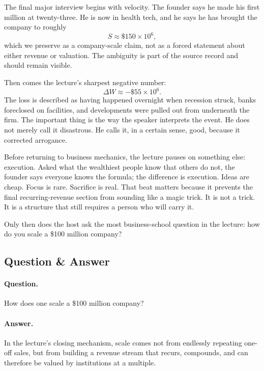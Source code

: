 The final major interview begins with velocity. The founder says he made his first million at twenty-three. He is now in health tech, and he says he has brought the company to roughly
\begin{equation}
S \approx \$150 \times 10^6,
\end{equation}
which we preserve as a company-scale claim, not as a forced statement about either revenue or valuation. The ambiguity is part of the source record and should remain visible.

Then comes the lecture's sharpest negative number:
\begin{equation}
\Delta W \approx -\$55 \times 10^6.
\end{equation}
The loss is described as having happened overnight when recession struck, banks foreclosed on facilities, and developments were pulled out from underneath the firm. The important thing is the way the speaker interprets the event. He does not merely call it disastrous. He calls it, in a certain sense, good, because it corrected arrogance.

Before returning to business mechanics, the lecture pauses on something else: execution. Asked what the wealthiest people know that others do not, the founder says everyone knows the formula; the difference is execution. Ideas are cheap. Focus is rare. Sacrifice is real. That beat matters because it prevents the final recurring-revenue section from sounding like a magic trick. It is not a trick. It is a structure that still requires a person who will carry it.

Only then does the host ask the most business-school question in the lecture: how do you scale a \$100 million company?

\subsection{Question \& Answer}

\paragraph{Question.} How does one scale a \$100 million company?

\paragraph{Answer.} In the lecture's closing mechanism, scale comes not from endlessly repeating one-off sales, but from building a revenue stream that recurs, compounds, and can therefore be valued by institutions at a multiple.

